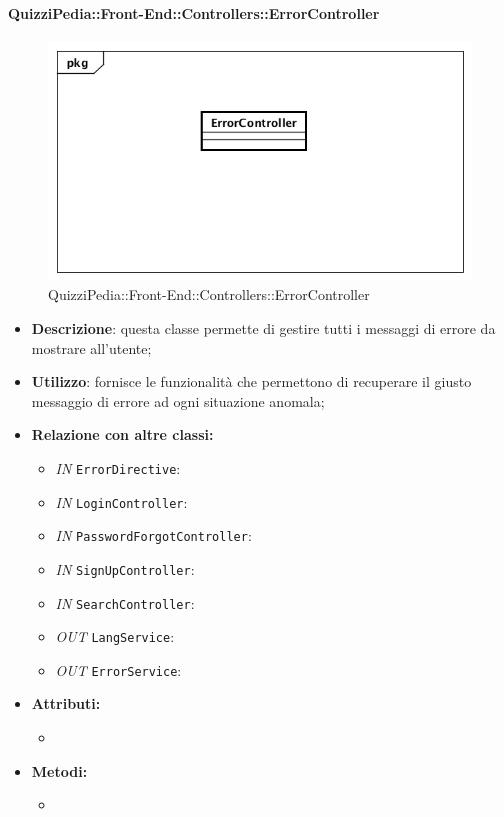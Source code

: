 \paragraph{QuizziPedia::Front-End::Controllers::ErrorController}
\begin{figure}
	\centering
	\includegraphics[scale=0.45]{UML/Classi/Front-End/QuizziPedia_Front-end_Controller_ErrorController.png}
	\caption{QuizziPedia::Front-End::Controllers::ErrorController}
\end{figure}
\begin{itemize}
	\item \textbf{Descrizione}: questa classe permette di gestire tutti i messaggi di errore da mostrare all'utente;
	\item \textbf{Utilizzo}: fornisce le funzionalità che permettono di recuperare il giusto messaggio di errore ad ogni situazione anomala;
	\item \textbf{Relazione con altre classi:}
	\begin{itemize}
		\item \textit{IN} \texttt{ErrorDirective}: 
		\item \textit{IN} \texttt{LoginController}: 
		\item \textit{IN} \texttt{PasswordForgotController}: 
		\item \textit{IN} \texttt{SignUpController}: 
		\item \textit{IN} \texttt{SearchController}: 
		\item \textit{OUT} \texttt{LangService}: 
		\item \textit{OUT} \texttt{ErrorService}: 
	\end{itemize}
	\item \textbf{Attributi:}
	\begin{itemize}
		\item 
	\end{itemize}
	\item \textbf{Metodi:}
	\begin{itemize}
		\item 
	\end{itemize}
\end{itemize}

